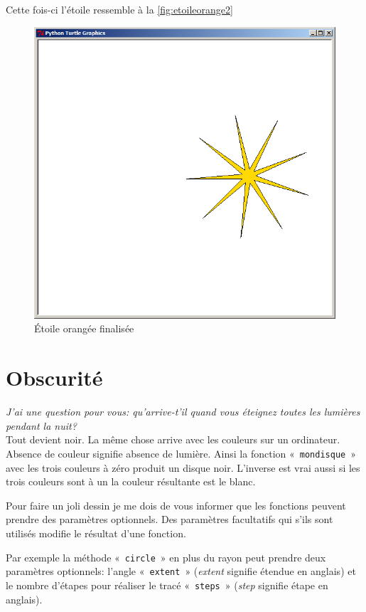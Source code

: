 Cette fois-ci l'étoile ressemble à la \autoref{fig:etoileorange2}
\begin{figure}[h!]
\centering
\includegraphics[scale=0.4]{images/etoileorange2}
\caption{Étoile orangée finalisée}\label{fig:etoileorange2}
\end{figure}

\section{Obscurité}

\emph{J'ai une question pour vous: qu'arrive-t'il quand vous éteignez toutes les lumières pendant la nuit?}\\

Tout devient noir. La même chose arrive avec les couleurs sur un ordinateur. Absence de couleur signifie absence de lumière. Ainsi la fonction « \texttt{mondisque} » avec les trois couleurs à zéro produit un disque noir. L'inverse est vrai aussi si les trois couleurs sont à un la couleur résultante est le blanc.

Pour faire un joli dessin je me dois de vous informer que les fonctions peuvent prendre des paramètres optionnels. Des paramètres facultatifs qui s'ils sont utilisés modifie le résultat d'une fonction.

Par exemple la méthode « \texttt{circle} » en plus du rayon peut prendre deux paramètres optionnels: l'angle « \texttt{extent} » (\emph{extent} signifie étendue en anglais) et le nombre d'étapes pour réaliser le tracé « \texttt{steps} »   (\emph{step} signifie étape en anglais).

